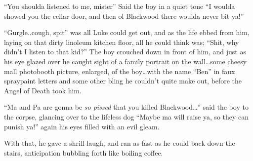 ``You shoulda listened to me, mister'' Said the boy in a quiet tone
``I woulda showed you the cellar door, and then ol Blackwood there
woulda never bit ya!''

``Gurgle..cough, spit'' was all Luke could get out, and as the life
ebbed from him, laying on that dirty linoleum kitchen floor, all he
could think was; ``Shit, why didn't I listen to that kid?'' The boy
crouched down in front of him, and just as his eye glazed over he
caught sight of a family portrait on the wall{\ldots}some cheesy mall
photobooth picture, enlarged, of the boy{\ldots}with the name ``Ben'' in
faux spraypaint letters and some other bling he couldn't quite make
out, before the Angel of Death took him.

``Ma and Pa are gonna be {\em so pissed} that you killed
Blackwood{\ldots}'' said the boy to the corpse, glancing over to the
lifeless dog ``Maybe ma will raise ya, so they can punish ya!'' again
his eyes filled with an evil gleam.

With that, he gave a shrill laugh, and ran as fast as he could back
down the stairs, anticipation bubbling forth like boiling coffee. 

 



